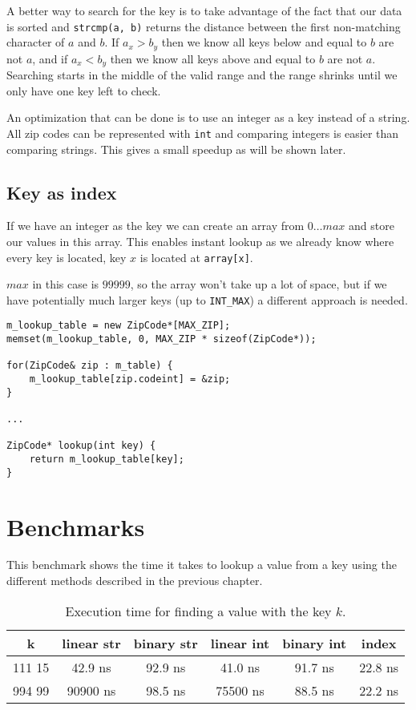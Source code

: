 \documentclass[a4paper,11pt]{article}
\begin{document}
A better way to search for the key is to take advantage of the fact that our data is sorted and \texttt{strcmp(a, b)} returns the distance between the first non-matching character of $a$ and $b$.
If $a_x > b_y$ then we know all keys below and equal to $b$ are not $a$, and if $a_x < b_y$ then we know all keys above and equal to $b$ are not $a$.
Searching starts in the middle of the valid range and the range shrinks until we only have one key left to check.

An optimization that can be done is to use an integer as a key instead of a string. All zip codes can be represented with \texttt{int} and comparing integers is easier than comparing strings.
This gives a small speedup as will be shown later.

\subsection*{Key as index}

If we have an integer as the key we can create an array from $0 \dots max$ and store our values in this array.
This enables instant lookup as we already know where every key is located, key $x$ is located at \texttt{array[x]}.

$max$ in this case is $99999$, so the array won't take up a lot of space, but if we have potentially much larger keys (up to \texttt{INT_MAX}) a different approach is needed.

\begin{verbatim}
m_lookup_table = new ZipCode*[MAX_ZIP];
memset(m_lookup_table, 0, MAX_ZIP * sizeof(ZipCode*));

for(ZipCode& zip : m_table) {
	m_lookup_table[zip.codeint] = &zip;
}

...

ZipCode* lookup(int key) {
	return m_lookup_table[key];
}
\end{verbatim}

\section*{Benchmarks}

This benchmark shows the time it takes to lookup a value from a key using the different methods described in the previous chapter.

\begin{table}[H]
\centering
\begin{tabular}{|c|c|c|c|c|c|}
\hline
\textbf{k} & \textbf{linear str} & \textbf{binary str} & \textbf{linear int} & \textbf{binary int} & \textbf{index} \\
\hline
	111 15 & 42.9 ns & 92.9 ns & 41.0 ns & 91.7 ns & 22.8 ns \\
	994 99 & 90900 ns & 98.5 ns & 75500 ns & 88.5 ns & 22.2 ns \\
\hline
\end{tabular}
\caption{Execution time for finding a value with the key $k$.}
\label{tab:table1}
\end{table}
\end{document}
